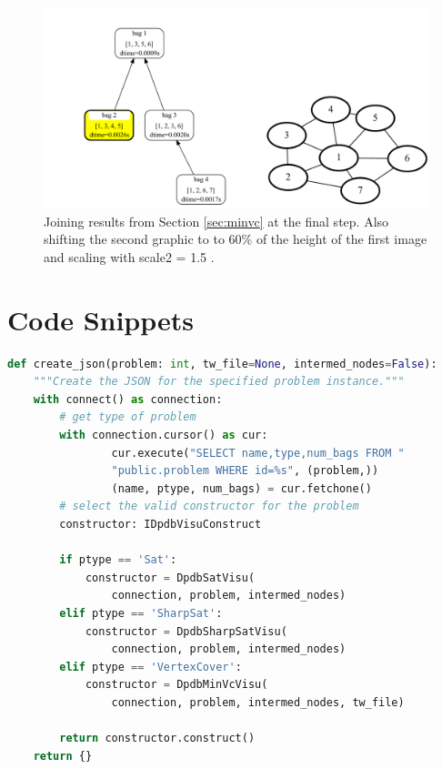 \documentclass[a4paper, 12pt, bibliography=totoc]{scrartcl}
\begin{document}
\begin{figure}
	\centering
	\includegraphics[width=0.9\linewidth,height=0.9\textheight,keepaspectratio]{images/SVGJOIN/default_06sc15_rise1.pdf}
	\caption{Joining results from Section \ref{sec:minvc} at the final step. Also shifting the second graphic to to $60\%$ of the height of the first image and scaling with scale2 = 1.5 .}
	\label{fig:joinscaledrise5}
\end{figure}

\newpage
\section{Code Snippets}




\begin{lstlisting}[language={Python}, caption={Construct\_dpdb\_visu.py}, label={lst:create-json}]
def create_json(problem: int, tw_file=None, intermed_nodes=False):
	"""Create the JSON for the specified problem instance."""
	with connect() as connection:
		# get type of problem
		with connection.cursor() as cur:
				cur.execute("SELECT name,type,num_bags FROM "
				"public.problem WHERE id=%s", (problem,))
				(name, ptype, num_bags) = cur.fetchone()	
		# select the valid constructor for the problem
		constructor: IDpdbVisuConstruct
		
		if ptype == 'Sat':
			constructor = DpdbSatVisu(
				connection, problem, intermed_nodes)
		elif ptype == 'SharpSat':
			constructor = DpdbSharpSatVisu(
				connection, problem, intermed_nodes)
		elif ptype == 'VertexCover':
			constructor = DpdbMinVcVisu(
				connection, problem, intermed_nodes, tw_file)
		
		return constructor.construct()
	return {} 
\end{lstlisting}
\end{document}
